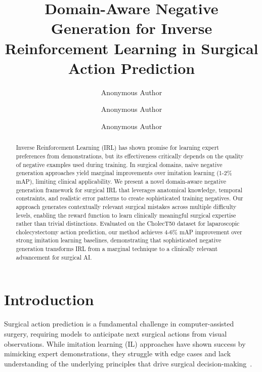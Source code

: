 \documentclass[runningheads]{llncs}
\begin{document}
\title{Domain-Aware Negative Generation for Inverse Reinforcement Learning in Surgical Action Prediction}

\author{Anonymous Author \and
Anonymous Author \and
Anonymous Author}



\maketitle

\begin{abstract}
Inverse Reinforcement Learning (IRL) has shown promise for learning expert preferences from demonstrations, but its effectiveness critically depends on the quality of negative examples used during training. In surgical domains, naive negative generation approaches yield marginal improvements over imitation learning (1-2\% mAP), limiting clinical applicability. We present a novel domain-aware negative generation framework for surgical IRL that leverages anatomical knowledge, temporal constraints, and realistic error patterns to create sophisticated training negatives. Our approach generates contextually relevant surgical mistakes across multiple difficulty levels, enabling the reward function to learn clinically meaningful surgical expertise rather than trivial distinctions. Evaluated on the CholecT50 dataset for laparoscopic cholecystectomy action prediction, our method achieves 4-6\% mAP improvement over strong imitation learning baselines, demonstrating that sophisticated negative generation transforms IRL from a marginal technique to a clinically relevant advancement for surgical AI.

\end{abstract}

\section{Introduction}

Surgical action prediction is a fundamental challenge in computer-assisted surgery, requiring models to anticipate next surgical actions from visual observations. While imitation learning (IL) approaches have shown success by mimicking expert demonstrations, they struggle with edge cases and lack understanding of the underlying principles that drive surgical decision-making~\cite{author2023surgical}.
\end{document}
